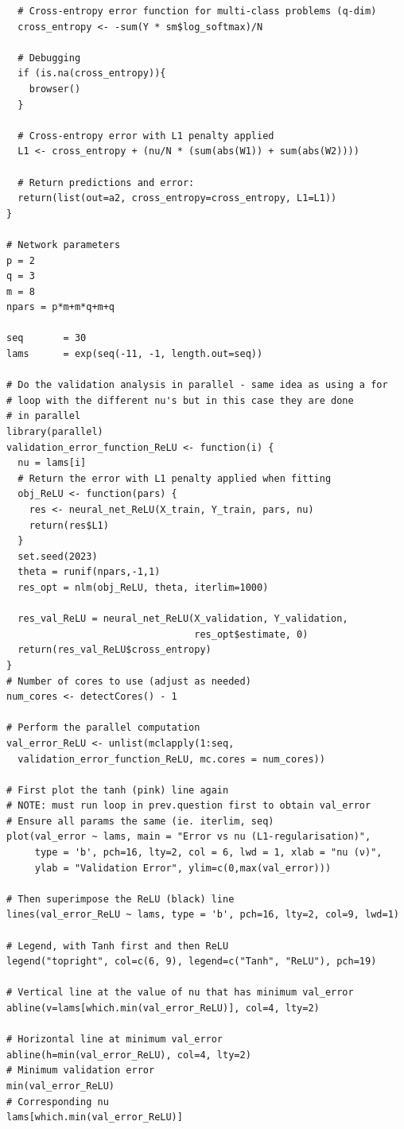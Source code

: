 \documentclass[12pt]{article}
\begin{document}
\begin{lstlisting}
  # Cross-entropy error function for multi-class problems (q-dim) 
  cross_entropy <- -sum(Y * sm$log_softmax)/N
  
  # Debugging
  if (is.na(cross_entropy)){
    browser()
  }
  
  # Cross-entropy error with L1 penalty applied
  L1 <- cross_entropy + (nu/N * (sum(abs(W1)) + sum(abs(W2))))
  
  # Return predictions and error:
  return(list(out=a2, cross_entropy=cross_entropy, L1=L1))
}

# Network parameters
p = 2
q = 3
m = 8
npars = p*m+m*q+m+q

seq       = 30
lams      = exp(seq(-11, -1, length.out=seq))

# Do the validation analysis in parallel - same idea as using a for 
# loop with the different nu's but in this case they are done 
# in parallel
library(parallel)
validation_error_function_ReLU <- function(i) {
  nu = lams[i]
  # Return the error with L1 penalty applied when fitting
  obj_ReLU <- function(pars) {
    res <- neural_net_ReLU(X_train, Y_train, pars, nu)
    return(res$L1)
  }
  set.seed(2023)
  theta = runif(npars,-1,1)
  res_opt = nlm(obj_ReLU, theta, iterlim=1000)
  
  res_val_ReLU = neural_net_ReLU(X_validation, Y_validation, 
                                 res_opt$estimate, 0) 
  return(res_val_ReLU$cross_entropy)
}
# Number of cores to use (adjust as needed)
num_cores <- detectCores() - 1

# Perform the parallel computation
val_error_ReLU <- unlist(mclapply(1:seq, 
  validation_error_function_ReLU, mc.cores = num_cores))

# First plot the tanh (pink) line again 
# NOTE: must run loop in prev.question first to obtain val_error 
# Ensure all params the same (ie. iterlim, seq)
plot(val_error ~ lams, main = "Error vs nu (L1-regularisation)", 
     type = 'b', pch=16, lty=2, col = 6, lwd = 1, xlab = "nu (ν)", 
     ylab = "Validation Error", ylim=c(0,max(val_error)))

# Then superimpose the ReLU (black) line
lines(val_error_ReLU ~ lams, type = 'b', pch=16, lty=2, col=9, lwd=1)

# Legend, with Tanh first and then ReLU
legend("topright", col=c(6, 9), legend=c("Tanh", "ReLU"), pch=19)

# Vertical line at the value of nu that has minimum val_error
abline(v=lams[which.min(val_error_ReLU)], col=4, lty=2)

# Horizontal line at minimum val_error
abline(h=min(val_error_ReLU), col=4, lty=2)
# Minimum validation error
min(val_error_ReLU)
# Corresponding nu
lams[which.min(val_error_ReLU)]



\end{lstlisting}
\end{document}
